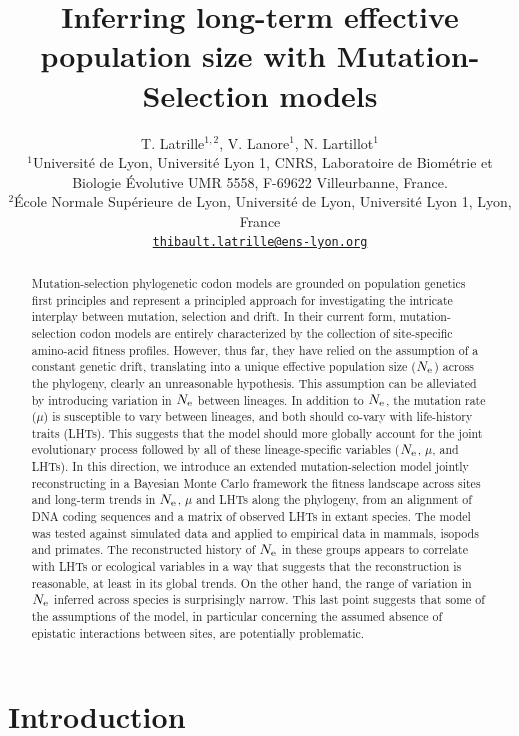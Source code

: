 \documentclass{article}
\title{Inferring long-term effective population size with Mutation-Selection models}
\author{
    \large
    T. {Latrille}$^{1,2}$, V. {Lanore}$^{1}$, N. {Lartillot}$^{1}$ \\
    \normalsize
    $^{1}$Université de Lyon, Université Lyon 1, CNRS, Laboratoire de Biométrie et Biologie Évolutive UMR 5558, F-69622 Villeurbanne, France.\\
    $^{2}$École Normale Supérieure de Lyon, Université de Lyon, Université Lyon 1, Lyon, France\\
    \texttt{\href{mailto:thibault.latrille@ens-lyon.org}{thibault.latrille@ens-lyon.org}} \\
}
\begin{document}
    \maketitle

    \begin{abstract}
        Mutation-selection phylogenetic codon models are grounded on population genetics first principles and represent a principled approach for investigating the intricate interplay between mutation, selection and drift.
        In their current form, mutation-selection codon models are entirely characterized by the collection of site-specific amino-acid fitness profiles.
        However, thus far, they have relied on the assumption of a constant genetic drift, translating into a unique effective population size ($N_{\text{e}}$) across the phylogeny, clearly an unreasonable hypothesis.
        This assumption can be alleviated by introducing variation in $N_{\text{e}}$ between lineages.
        In addition to $N_{\text{e}}$, the mutation rate ($\mu$) is susceptible to vary between lineages, and both should co-vary with life-history traits (LHTs).
        This suggests that the model should more globally account for the joint evolutionary process followed by all of these lineage-specific variables ($N_{\text{e}}$, $\mu$, and LHTs).
        In this direction, we introduce an extended mutation-selection model jointly reconstructing in a Bayesian Monte Carlo framework the fitness landscape across sites and long-term trends in $N_{\text{e}}$, $\mu$ and LHTs along the phylogeny, from an alignment of DNA coding sequences and a matrix of observed LHTs in extant species.
        The model was tested against simulated data and applied to empirical data in mammals, isopods and primates.
        The reconstructed history of $N_{\text{e}}$ in these groups appears to correlate with LHTs or ecological variables in a way that suggests that the reconstruction is reasonable, at least in its global trends.
        On the other hand, the range of variation in $N_{\text{e}}$ inferred across species is surprisingly narrow.
        This last point suggests that some of the assumptions of the model, in particular concerning the assumed absence of epistatic interactions between sites, are potentially problematic.
    \end{abstract}


    \section{Introduction}
    \label{sec:Introduction}
\end{document}

